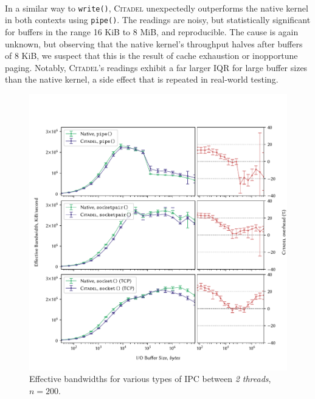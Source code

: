 \paragraph{} In a similar way to \texttt{write()}, \textsc{Citadel} unexpectedly outperforms the native kernel in both contexts using \texttt{pipe()}. The readings are noisy, but statistically significant for buffers in the range 16 KiB to 8 MiB, and reproducible. The cause is again unknown, but observing that the native kernel's throughput halves after buffers of 8 KiB, we suspect that this is the result of cache exhaustion or inopportune paging. Notably, \textsc{Citadel}'s readings exhibit a far larger IQR for large buffer sizes than the native kernel, a side effect that is repeated in real-world testing.

\begin{figure}[]
    \centering
    \includegraphics[width=\linewidth]{figures/graphs/ipc-2thread.pdf}
    \vspace{-5mm}
    \caption{Effective bandwidths for various types of IPC between \textit{2 threads}, $n=200$.}
    \label{fig:ipc-2thread-graph}
\end{figure}


